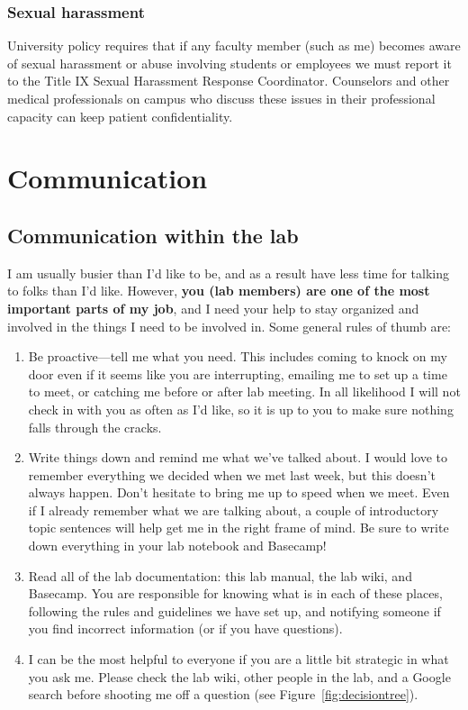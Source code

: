 \documentclass[letterpaper,12pt,oneside]{memoir}
\begin{document}
\subsection{Sexual harassment}
University policy requires that if any faculty member (such as me) becomes aware of  sexual harassment or abuse involving students or employees we must report it to the Title IX Sexual Harassment Response Coordinator. Counselors and other medical professionals on campus who discuss these issues in their professional capacity can keep patient confidentiality.




\chapter{Communication}
\section{Communication within the lab}
\label{sec:communicationInLab}

I am usually busier than I'd like to be, and as a result have less time for talking to folks than I'd like. However, \textbf{you (lab members) are one of the most important parts of my job}, and I need your help to stay organized and involved in the things I need to be involved in. Some general rules of thumb are:

\begin{enumerate}
\item Be proactive---tell me what you need. This includes coming to knock on my door even if it seems like you are interrupting, emailing me to set up a time to meet, or catching me before or after lab meeting. In all likelihood I will not check in with you as often as I'd like, so it is up to you to make sure nothing falls through the cracks.

\item Write things down and remind me what we've talked about. I would love to remember everything we decided when we met last week, but this doesn't always happen. Don't hesitate to bring me up to speed when we meet. Even if I already remember what we are talking about, a couple of introductory topic sentences will help get me in the right frame of mind. Be sure to write down everything in your lab notebook and Basecamp!

\item Read all of the lab documentation: this lab manual, the lab wiki, and Basecamp. You are responsible for knowing what is in each of these places, following the rules and guidelines we have set up, and notifying someone if you find incorrect information (or if you have questions).

\item I can be the most helpful to everyone if you are a little bit strategic in what you ask me. Please check the lab wiki, other people in the lab, and a Google search before shooting me off a question (see Figure~\ref{fig:decisiontree}).

\end{enumerate}
\end{document}
